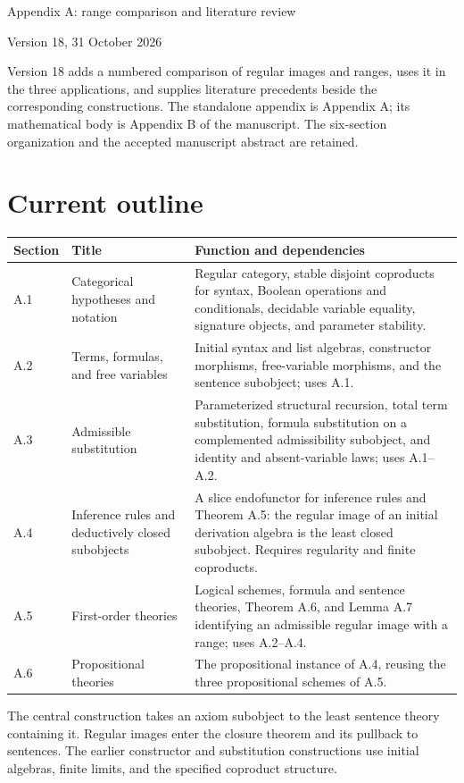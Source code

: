\documentclass[10pt]{article}
\begin{document}
{\LARGE Appendix A: range comparison and literature review}\par
{\large Version 18, 31 October 2026}\par

Version 18 adds a numbered comparison of regular images and ranges,
uses it in the three applications, and supplies literature precedents
beside the corresponding constructions. The standalone appendix is
Appendix A; its mathematical body is Appendix B of the manuscript.
The six-section organization and the accepted manuscript abstract are retained.

\section*{Current outline}
\renewcommand{\arraystretch}{1.15}
\begin{tabularx}{\textwidth}{@{}P{0.075\textwidth}P{0.295\textwidth}Y@{}}
\toprule
Section & Title & Function and dependencies\\\midrule
A.1 & Categorical hypotheses and notation & Regular category, stable disjoint
coproducts for syntax, Boolean operations and conditionals, decidable variable
equality, signature objects, and parameter stability.\\
A.2 & Terms, formulas, and free variables & Initial syntax and list algebras,
constructor morphisms, free-variable morphisms, and the sentence subobject;
uses A.1.\\
A.3 & Admissible substitution & Parameterized structural recursion, total term
substitution, formula substitution on a complemented admissibility subobject,
and identity and absent-variable laws; uses A.1--A.2.\\
A.4 & Inference rules and deductively closed subobjects & A slice endofunctor
for inference rules and Theorem A.5: the regular image of an initial derivation
algebra is the least closed subobject. Requires regularity and finite coproducts.\\
A.5 & First-order theories & Logical schemes, formula and sentence theories,
Theorem A.6, and Lemma A.7 identifying an admissible regular image with a range;
uses A.2--A.4.\\
A.6 & Propositional theories & The propositional instance of A.4, reusing the
three propositional schemes of A.5.\\\bottomrule
\end{tabularx}

The central construction takes an axiom subobject to the least sentence theory
containing it. Regular images enter the closure theorem and its pullback to
sentences. The earlier constructor and substitution constructions use initial
algebras, finite limits, and the specified coproduct structure.
\end{document}
